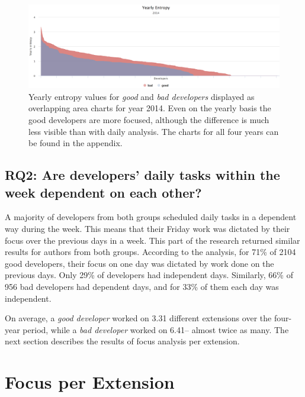 \begin{figure}[htpb]
  \centering
  \includegraphics[width=1\textwidth]{figures/yearly_2014}
  \caption[Yearly Focus Chart for 2014]{Yearly entropy values for \textit{good} and \textit{bad developers} displayed as overlapping area charts for year 2014. Even on the yearly basis the good developers are more focused, although the difference is much less visible than with daily analysis. The charts for all four years can be found in the appendix.} \label{fig:yearly_2014}
\end{figure}

\subsection{RQ2: Are developers’ daily tasks within the week dependent on each other?}

A majority of developers from both groups scheduled daily tasks in a dependent way during the week. This means that their Friday work was dictated by their focus over the previous days in a week. This part of the research returned similar results for authors from both groups. According to the analysis, for 71\% of 2104 good developers, their focus on one day was dictated by work done on the previous days. Only 29\% of developers had independent days. Similarly, 66\% of 956 bad developers had dependent days, and for 33\% of them each day was independent. \par

On average, a \textit{good developer} worked on 3.31 different extensions over the four-year period, while a \textit{bad developer} worked on 6.41– almost twice as many. The next section describes the results of focus analysis per extension. \par

\section{Focus per Extension}

